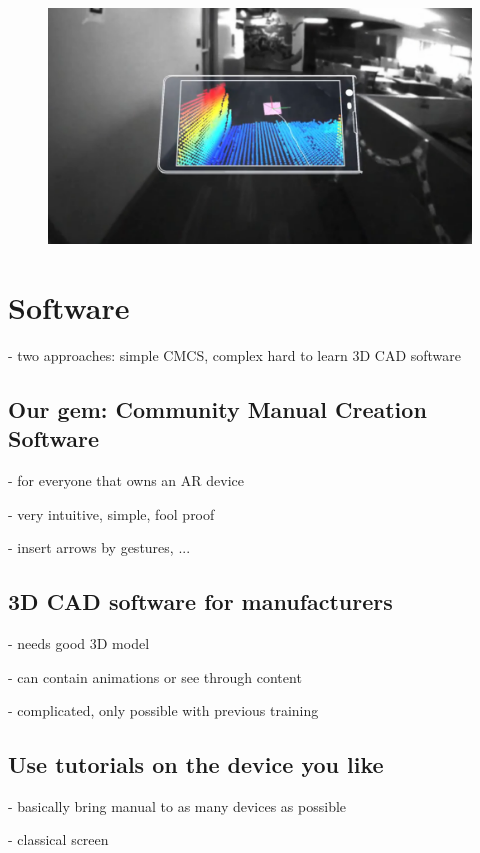 		\begin{figure}[H]
			\centering
			\includegraphics[width=0.7\linewidth]{../images/project-tango}
			\caption{}
			\label{fig:project-tango}
		\end{figure}
		
	

	\section{Software}
	
		- two approaches: simple CMCS, complex hard to learn 3D CAD software
		
		\subsection{Our gem: Community Manual Creation Software}
		
			- for everyone that owns an AR device
			
			- very intuitive, simple, fool proof
			
			- insert arrows by gestures, ...
	
		\subsection{3D CAD software for manufacturers}
		
			- needs good 3D model
			
			- can contain animations or see through content

			- complicated, only possible with previous training

		\subsection{Use tutorials on the device you like}
		
			- basically bring manual to as many devices as possible
			
			- classical screen
			

